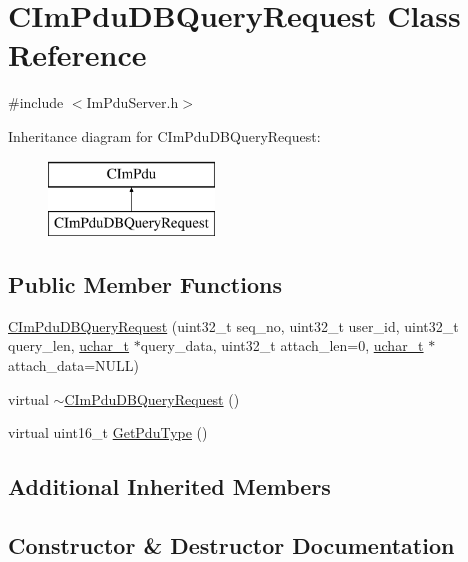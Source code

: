 \hypertarget{class_c_im_pdu_d_b_query_request}{}\section{C\+Im\+Pdu\+D\+B\+Query\+Request Class Reference}
\label{class_c_im_pdu_d_b_query_request}


{\ttfamily \#include $<$Im\+Pdu\+Server.\+h$>$}

Inheritance diagram for C\+Im\+Pdu\+D\+B\+Query\+Request\+:\begin{figure}[H]
\begin{center}
\leavevmode
\includegraphics[height=2.000000cm]{class_c_im_pdu_d_b_query_request}
\end{center}
\end{figure}
\subsection*{Public Member Functions}
\begin{DoxyCompactItemize}
\item 
\hyperlink{class_c_im_pdu_d_b_query_request_afb2ecd346c5bfd44e43646f4836ea89c}{C\+Im\+Pdu\+D\+B\+Query\+Request} (uint32\+\_\+t seq\+\_\+no, uint32\+\_\+t user\+\_\+id, uint32\+\_\+t query\+\_\+len, \hyperlink{base_2ostype_8h_a124ea0f8f4a23a0a286b5582137f0b8d}{uchar\+\_\+t} $\ast$query\+\_\+data, uint32\+\_\+t attach\+\_\+len=0, \hyperlink{base_2ostype_8h_a124ea0f8f4a23a0a286b5582137f0b8d}{uchar\+\_\+t} $\ast$attach\+\_\+data=N\+U\+L\+L)
\item 
virtual \hyperlink{class_c_im_pdu_d_b_query_request_a021ec2231e9ff5e1f1510aeeeb0f4e53}{$\sim$\+C\+Im\+Pdu\+D\+B\+Query\+Request} ()
\item 
virtual uint16\+\_\+t \hyperlink{class_c_im_pdu_d_b_query_request_a7ba4912872ef0d4f006bb47832a9a84f}{Get\+Pdu\+Type} ()
\end{DoxyCompactItemize}
\subsection*{Additional Inherited Members}


\subsection{Constructor \& Destructor Documentation}
\hypertarget{class_c_im_pdu_d_b_query_request_afb2ecd346c5bfd44e43646f4836ea89c}{}
